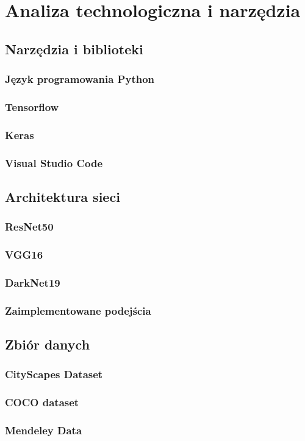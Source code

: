 \chapter{Analiza technologiczna i narzędzia}
\section{Narzędzia i biblioteki}
\subsection{Język programowania Python}
\subsection{Tensorflow}
\subsection{Keras}
\subsection{Visual Studio Code}
\section{Architektura sieci}
\subsection{ResNet50}
\subsection{VGG16}
\subsection{DarkNet19}
\subsection{Zaimplementowane podejścia}
\section{Zbiór danych}
\subsection{CityScapes Dataset}
\subsection{COCO dataset}
\subsection{Mendeley Data}
